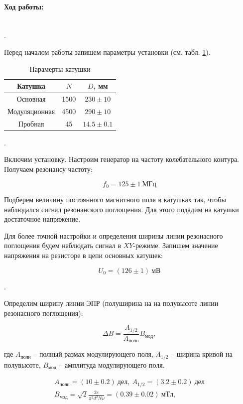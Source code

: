 \documentclass[a4paper, 12pt]{article}
\newcommand{\eps}{\varepsilon}
\newcommand{\parag}[1]{\paragraph*{#1:}}
\newcounter{Points}
\newcommand{\point}{\arabic{Points}. \addtocounter{Points}{1}}
\begin{document}
\parag {Ход работы} ~\\

\point Перед началом работы запишем параметры установки (см. табл. \ref{tab:kat}).

\begin{table}[!h]
    \centering
    \begin{tabular}{|c|c|c|}
        \hline
        Катушка & $N$ & $D$, мм \\ \hline
        Основная      & 1500 & $230  \pm 10$  \\ \hline
        Модуляционная & 4500 & $290  \pm 10$  \\ \hline
        Пробная       & 45   & $14.5 \pm 0.1$ \\ \hline
    \end{tabular}
    \caption {Парамерты катушки}
    \label{tab:kat}
\end{table}

\point Включим установку. Настроим генератор на частоту колебательного контура. Получаем резонансу частоту:

\[
    f_0 = 125 \pm 1 ~ МГц
\]

Подберем величину постоянного магнитного поля в катушках так, чтобы наблюдался сигнал резонанского поглощения. Для этого подадим на катушки достаточное напряжение.

Для более точной настройки и определения ширины линии резонасного поглощения будем наблюдать сигнал в $XY$-режиме. Запишем значение напряжения на резисторе в цепи основных катушек:
		
\begin{equation*}
    U_0 = (126 \pm 1) ~мВ
\end{equation*}

\point Определим ширину линии ЭПР (полуширина на на полувысоте линии резонасного поглощения):

\begin{equation*}
    \Delta B = \frac{A_{1/2}}{A_{полн}}B_{мод},
\end{equation*}

где $A_{полн}$ -- полный размах модулирующего поля, $A_{1/2}$ -- ширина кривой на полувысоте, $B_{мод}$ -- амплитуда модулирующего поля.

\begin{equation*}
    \begin{gathered}
        A_{полн} = (10 \pm 0.2) ~дел, ~ A_{1/2} = (3.2 \pm 0.2) ~дел \\
        B_{мод} = \sqrt{2} \frac{2\eps}{\pi^2d^2N\nu} = (0.39 \pm 0.02) ~мТл,
    \end{gathered}
\end{equation*}
\end{document}
